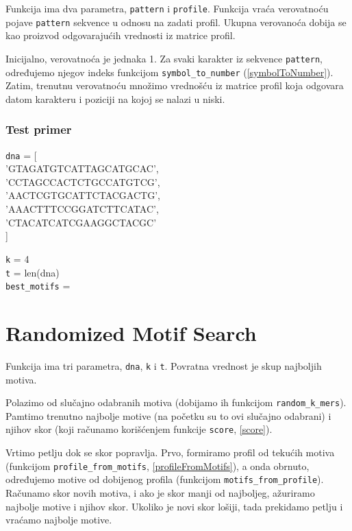 Funkcija ima dva parametra, \texttt{pattern} i \texttt{profile}. Funkcija vraća verovatnoću pojave \texttt{pattern} sekvence u odnosu na zadati profil. Ukupna verovanoća dobija se kao proizvod odgovarajućih vrednosti iz matrice profil.

Inicijalno, verovatnoća je jednaka 1. Za svaki karakter iz sekvence \texttt{pattern}, određujemo njegov indeks funkcijom \texttt{symbol\_to\_number} (\ref{symbolToNumber}). Zatim, trenutnu verovatnoću množimo vrednošću iz matrice profil koja odgovara datom karakteru i poziciji na kojoj se nalazi u niski.




\subsubsection{Test primer}
\noindent\texttt{dna} = [ \\
'GTAGATGTCATTAGCATGCAC', \\
'CCTAGCCACTCTGCCATGTCG', \\
'AACTCGTGCATTCTACGACTG', \\
'AAACTTTCCGGATCTTCATAC', \\
'CTACATCATCGAAGGCTACGC' \\
]

\noindent \texttt{k} = 4
\\\texttt{t} = len(dna)
\\\texttt{best\_motifs} =


\section{Randomized Motif Search}

Funkcija ima tri parametra, \texttt{dna}, \texttt{k} i \texttt{t}. Povratna vrednost je skup najboljih motiva.

Polazimo od slučajno odabranih motiva (dobijamo ih funkcijom \texttt{random\_k\_mers}). Pamtimo trenutno najbolje motive (na početku su to ovi slučajno odabrani) i njihov skor (koji računamo korišćenjem funkcije \texttt{score}, \ref{score}).

Vrtimo petlju dok se skor popravlja. Prvo, formiramo profil od tekućih motiva (funkcijom \texttt{profile\_from\_motifs}, \ref{profileFromMotifs}), a onda obrnuto, određujemo motive od dobijenog profila (funkcijom \texttt{motifs\_from\_profile}). Računamo skor novih motiva, i ako je skor manji od najboljeg, ažuriramo najbolje motive i njihov skor. Ukoliko je novi skor lošiji, tada prekidamo petlju i vraćamo najbolje motive.



